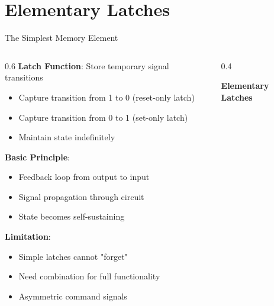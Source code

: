 \documentclass[aspectratio=169,11pt]{beamer}
\newcommand{\concept}[1]{\textbf{\color{accentcolor}#1}}
\begin{document}
\section{Elementary Latches}
\begin{frame}{The Simplest Memory Element}
\begin{columns}
\begin{column}{0.6\textwidth}
\concept{Latch Function}: Store temporary signal transitions
\begin{itemize}
\item Capture transition from 1 to 0 (reset-only latch)
\item Capture transition from 0 to 1 (set-only latch)
\item Maintain state indefinitely
\end{itemize}
\vspace{0.3cm}
\concept{Basic Principle}:
\begin{itemize}
\item Feedback loop from output to input
\item Signal propagation through circuit
\item State becomes self-sustaining
\end{itemize}
\vspace{0.3cm}
\concept{Limitation}: 
\begin{itemize}
\item Simple latches cannot "forget"
\item Need combination for full functionality
\item Asymmetric command signals
\end{itemize}
\end{column}
\begin{column}{0.4\textwidth}
\begin{center}
\textbf{Elementary Latches}
\vspace{0.3cm}

\end{center}
\end{column}
\end{columns}
\end{frame}
\end{document}
